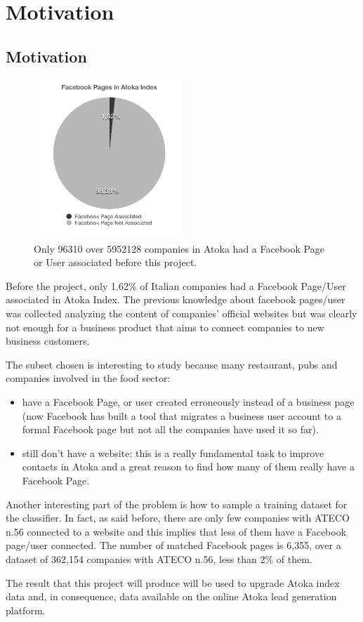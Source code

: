 \chapter{Motivation} 
\section{Motivation}

\begin{figure}
\centering
\includegraphics[width=0.5\textwidth]{img/facebook_atoka_bw.png}
\caption{Only 96310 over 5952128 companies in Atoka had a Facebook Page or User associated before this project.}
\label{Fig.1}
\end{figure}


Before the project, only 1.62\% of Italian companies had a Facebook Page/User associated in Atoka Index. The previous knowledge about facebook pages/user was collected analyzing the content of companies' official websites but was clearly not enough for a business product that aims to connect companies to new business customers.

The subset chosen is interesting to study because many restaurant, pubs and companies involved in the food sector:

\begin{itemize}
\item have a Facebook Page, or user created erroneously instead of a business page (now Facebook has built a tool that migrates a business user account to a formal Facebook page but not all the companies have used it so far).
\item still don't have a website: this is a really fundamental task to improve contacts in Atoka and a great reason to find how many of them really have a Facebook Page.
\end{itemize}

Another interesting part of the problem is how to sample a training dataset for the classifier. In fact, as said before, there are only few companies with ATECO n.56 connected to a website and this implies that less of them have a Facebook page/user connected. The number of matched Facebook pages is 6,355, over a dataset of 362,154 companies with ATECO n.56, less than 2\% of them.

The result that this project will produce will be used to upgrade Atoka index data and, in consequence, data available on the online Atoka lead generation platform.


